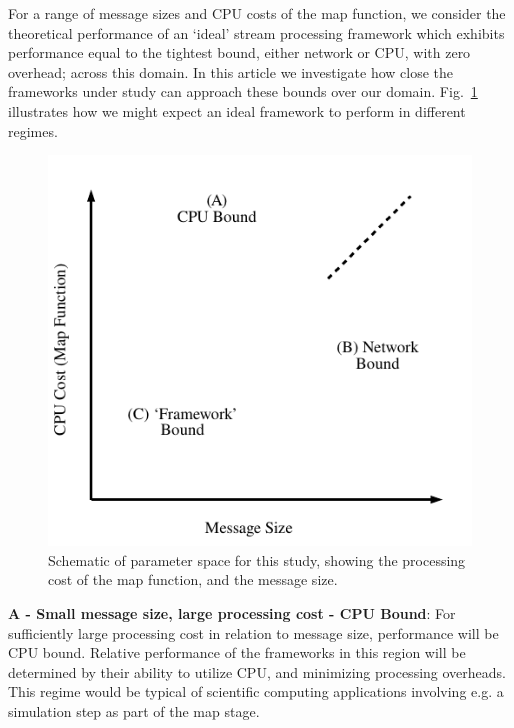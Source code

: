 \documentclass[letterpaper,conference]{IEEEtran}
\begin{document}
For a range of message sizes and CPU costs of the map function,
we consider the theoretical performance of an `ideal' stream processing framework which exhibits performance equal to the tightest bound, either network or CPU, with zero overhead; across this domain. %
In this article we investigate how close the frameworks under study can approach these bounds over our domain.  
Fig.~\ref{fig:prediction} illustrates how we might expect an ideal framework to perform in different regimes.  

\begin{figure}[h]
\begin{center}
\includegraphics[width=0.5\linewidth]{images/prediction}
\end{center}
\caption{Schematic of parameter space for this study, showing the processing cost of the map function, and the message size.}
\label{fig:prediction}
\end{figure}



\textbf{A - Small message size, large processing cost - CPU Bound}: For sufficiently large processing cost in relation to message size, performance will be CPU bound. Relative performance of the frameworks in this region will be determined by their ability to utilize CPU, and minimizing processing overheads. This regime would be typical of scientific computing applications involving e.g. a simulation step as part of the map stage.
\end{document}
